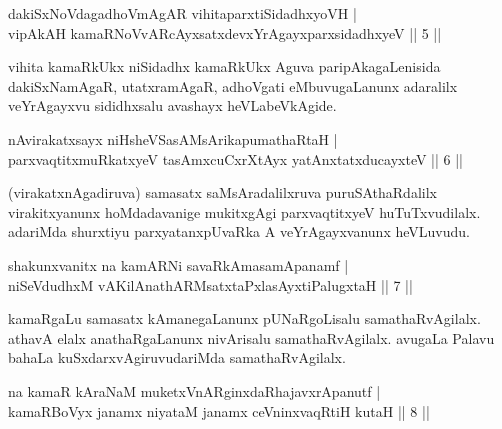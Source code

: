 
\begin{shl}
dakiSxNoVdagadhoVmAgAR vihitaparxtiSidadhxyoVH | \\
vipAkAH kamaRNoVvARcAyxsatxdevxYrAgayxparxsidadhxyeV \hfill|| 5 || 
\end{shl}

\begin{artha}
vihita kamaRkUkx niSidadhx kamaRkUkx Aguva paripAkagaLenisida 
dakiSxNamAgaR, utatxramAgaR, adhoVgati eMbuvugaLanunx adaralilx 
veYrAgayxvu sididhxsalu avashayx heVLabeVkAgide.
\end{artha}


\begin{shl}
nAvirakatxsayx niHsheVSasAMsArikapumathaRtaH | \\
parxvaqtitxmuRkatxyeV tasAmxcuCxrXtAyx yatAnxtatxducayxteV \hfill|| 6 || 
\end{shl}

\begin{artha}
(virakatxnAgadiruva) samasatx saMsAradalilxruva puruSAthaRdalilx 
virakitxyanunx hoMdadavanige mukitxgAgi parxvaqtitxyeV huTuTxvudilalx.
adariMda shurxtiyu parxyatanxpUvaRka A veYrAgayxvanunx heVLuvudu.
\end{artha}


\begin{shl}
shakunxvanitx na kamARNi savaRkAmasamApanamf | \\
niSeVdudhxM vA\s KilAnathARMsatxtaPxlasAyxtiPalugxtaH \hfill|| 7 || 
\end{shl}

\begin{artha}
kamaRgaLu samasatx kAmanegaLanunx pUNaRgoLisalu samathaRvAgilalx. 
athavA elalx anathaRgaLanunx nivArisalu samathaRvAgilalx. avugaLa 
Palavu bahaLa kuSxdarxvAgiruvudariMda samathaRvAgilalx.
\end{artha}


\begin{shl}
na kamaR kAraNaM muketxVnARginxdaRhajavxrApanutf | \\
kamaRBoVyx janamx niyataM janamx ceVninxvaqRtiH kutaH \hfill|| 8 || 
\end{shl}

